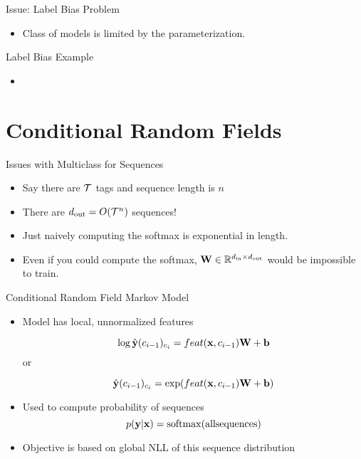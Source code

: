 \documentclass{beamer}
\begin{document}
\begin{frame}{Issue: Label Bias Problem}
  \begin{itemize}
  \item Class of models is limited by the parameterization.
    \air 
    \
  \end{itemize}
\end{frame}


\begin{frame}{Label Bias Example}
  \begin{itemize}
  \item 
  \end{itemize}
\end{frame}

\section{Conditional Random Fields}

\begin{frame}{Issues with Multiclass for Sequences }
  \begin{itemize}
  \item Say there are $\mathcal{T}$ tags and sequence length is $n$
    \air 

  \item There are ${d_{\mathrm{out}}} = O(\mathcal{T}^n)$ sequences! 
    \air 
  \item Just naively computing the softmax is exponential in length. 
    \air 

  \item Even if you could compute the softmax, $\mathbf{W} \in \mathbb{R}^{{d_{\mathrm{in}}} \times {d_{\mathrm{out}}}}$ would 
    be impossible to train.
  \end{itemize}
\end{frame}

\begin{frame}{Conditional Random Field Markov Model}
  \begin{itemize}
  \item Model has local, unnormalized features

    \[\log \hat{\mathbf{y}}(c_{i-1})_{c_i} = feat(\mathbf{x}, c_{i-1}) \mathbf{W} + \mathbf{b}\]
    or 

    \[ \hat{\mathbf{y}}(c_{i-1})_{c_i} = \exp(feat(\mathbf{x}, c_{i-1}) \mathbf{W} + \mathbf{b})\]

    

  \item Used to compute probability of sequences
    \[ p(\boldy | \boldx ) =  \softmax(\mathrm{all sequences})    \] 

  \item Objective is based on global NLL of this sequence distribution
   

  \end{itemize}
\end{frame}
\end{document}
